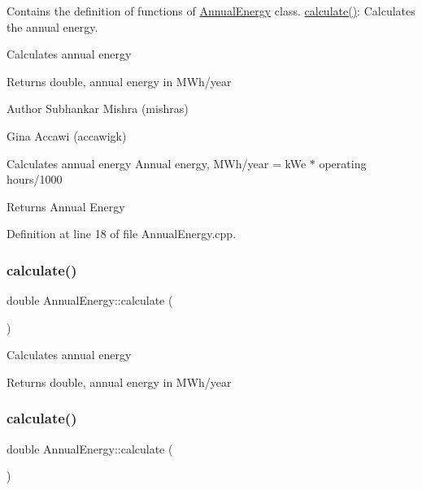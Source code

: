 Contains the definition of functions of \hyperlink{class_annual_energy}{Annual\+Energy} class. \hyperlink{class_annual_energy_ab599860ffb32ce20a1042a3e9d2ad57f}{calculate()}\+: Calculates the annual energy. 

Calculates annual energy \begin{DoxyReturn}{Returns}
double, annual energy in M\+Wh/year
\end{DoxyReturn}
\begin{DoxyAuthor}{Author}
Subhankar Mishra (mishras) 

Gina Accawi (accawigk) 
\end{DoxyAuthor}
Calculates annual energy Annual energy, M\+Wh/year = k\+We $\ast$ operating hours/1000 \begin{DoxyReturn}{Returns}
Annual Energy 
\end{DoxyReturn}


Definition at line 18 of file Annual\+Energy.\+cpp.

\mbox{\label{class_annual_energy_ab599860ffb32ce20a1042a3e9d2ad57f}} 
\subsubsection{\texorpdfstring{calculate()}{calculate()}\hspace{0.1cm}{\footnotesize\ttfamily [2/3]}}
{\footnotesize\ttfamily double Annual\+Energy\+::calculate (\begin{DoxyParamCaption}{ }\end{DoxyParamCaption})}

Calculates annual energy \begin{DoxyReturn}{Returns}
double, annual energy in M\+Wh/year 
\end{DoxyReturn}
\mbox{\label{class_annual_energy_ab599860ffb32ce20a1042a3e9d2ad57f}} 
\subsubsection{\texorpdfstring{calculate()}{calculate()}\hspace{0.1cm}{\footnotesize\ttfamily [3/3]}}
{\footnotesize\ttfamily double Annual\+Energy\+::calculate (\begin{DoxyParamCaption}{ }\end{DoxyParamCaption})}

